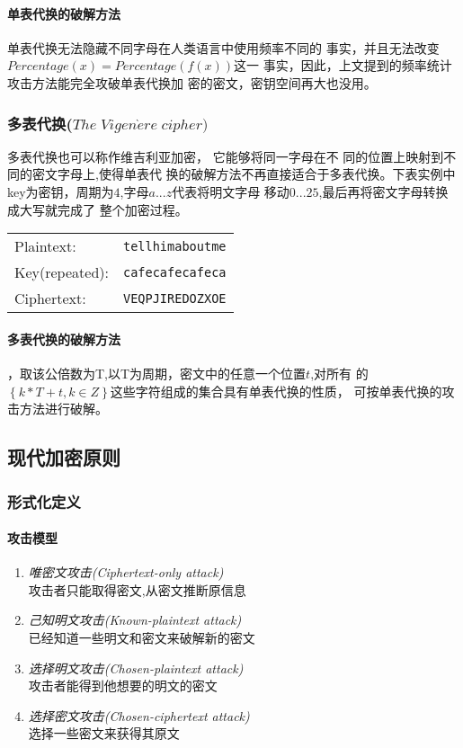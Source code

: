 \documentclass{article}
\begin{document}
	\paragraph{单表代换的破解方法}
	\par\indent
	单表代换无法隐藏不同字母在人类语言中使用频率不同的
	事实，并且无法改变$Percentage(x) =Percentage(f(x))$这一
	事实，因此，上文提到的频率统计攻击方法能完全攻破单表代换加
	密的密文，密钥空间再大也没用。
	
	
	\subsubsection{多表代换($The\; Vigen\grave{e}re\;cipher)$}
	\par\indent
	多表代换也可以称作维吉利亚加密，
	它能够将同一字母在不
	同的位置上映射到不同的密文字母上,使得单表代
	换的破解方法不再直接适合于多表代换。下表实例中
	key为密钥，周期为$4$,字母${a...z}$代表将明文字母
	移动${0...25}$,最后再将密文字母转换成大写就完成了
	整个加密过程。
	\\
	\begin{tabular}{lr}
		\hline
		Plaintext:&\texttt{tellhimaboutme}\\
		Key(repeated):&\texttt{cafecafecafeca}\\
		Ciphertext:&\texttt{VEQPJIREDOZXOE}\\
		\hline  
	\end{tabular}
	\paragraph{多表代换的破解方法}
	\par\indent
	，取该公倍数为T,以T为周期，密文中的任意一个位置$t$,对所有
	的$\left\{{k*T+t,k\in Z}\right\}$这些字符组成的集合具有单表代换的性质，
	可按单表代换的攻击方法进行破解。
	\subsection{现代加密原则}
	\subsubsection{形式化定义}
	\paragraph{攻击模型}
	\begin{enumerate}
		\item \textit{唯密文攻击(Ciphertext-only attack)} 
		\\攻击者只能取得密文,从密文推断原信息 
		\item \textit{己知明文攻击(Known-plaintext attack)}
		\\ 已经知道一些明文和密文来破解新的密文
		\item \textit{选择明文攻击(Chosen-plaintext attack)}
		\\ 攻击者能得到他想要的明文的密文
		\item \textit{选择密文攻击(Chosen-ciphertext attack)}
		\\ 选择一些密文来获得其原文
	\end{enumerate}
\end{document}
